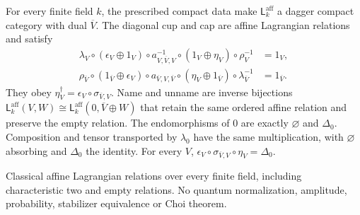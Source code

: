 \begin{proposition}
\statusProved{}
For every finite field $k$, the prescribed compact data make
$\mathsf L_k^{\mathrm{aff}}$ a dagger compact category with dual $\overline V$.
The diagonal cup and cap are affine Lagrangian relations and satisfy
\[
\begin{aligned}
 \lambda_V\circ(\epsilon_V\oplus1_V)\circ a^{-1}_{V,\overline V,V}
 \circ(1_V\oplus\eta_V)\circ\rho_V^{-1}&=1_V,\\
 \rho_{\overline V}\circ(1_{\overline V}\oplus\epsilon_V)
 \circ a_{\overline V,V,\overline V}\circ(\eta_V\oplus1_{\overline V})
 \circ\lambda_{\overline V}^{-1}&=1_{\overline V}.
\end{aligned}
\]
They obey $\eta_V^\dagger=\epsilon_V\circ\sigma_{\overline V,V}$.
Name and unname are inverse bijections
$\mathsf L_k^{\mathrm{aff}}(V,W)\cong
\mathsf L_k^{\mathrm{aff}}(0,\overline V\oplus W)$ that retain the same
ordered affine relation and preserve the empty relation.
The endomorphisms of $0$ are exactly $\varnothing$ and $\Delta_0$.
Composition and tensor transported by $\lambda_0$ have the same
multiplication, with $\varnothing$ absorbing and $\Delta_0$ the identity.
For every $V$, $\epsilon_V\circ\sigma_{\overline V,V}\circ\eta_V=\Delta_0$.
\end{proposition}
\begin{scope}
Classical affine Lagrangian relations over every finite field, including characteristic two and empty relations. No quantum normalization, amplitude, probability, stabilizer equivalence or Choi theorem.
\end{scope}

